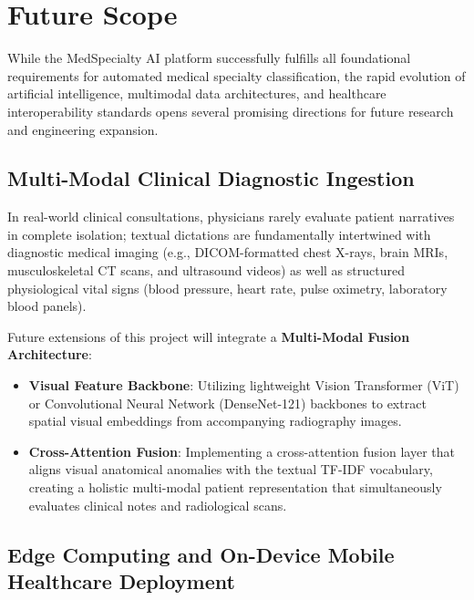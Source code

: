 \clearpage

\section{Future Scope}

While the MedSpecialty AI platform successfully fulfills all foundational requirements for automated medical specialty classification, the rapid evolution of artificial intelligence, multimodal data architectures, and healthcare interoperability standards opens several promising directions for future research and engineering expansion.

\subsection{Multi-Modal Clinical Diagnostic Ingestion}

In real-world clinical consultations, physicians rarely evaluate patient narratives in complete isolation; textual dictations are fundamentally intertwined with diagnostic medical imaging (e.g., DICOM-formatted chest X-rays, brain MRIs, musculoskeletal CT scans, and ultrasound videos) as well as structured physiological vital signs (blood pressure, heart rate, pulse oximetry, laboratory blood panels).

Future extensions of this project will integrate a \textbf{Multi-Modal Fusion Architecture}:
\begin{itemize}
    \item \textbf{Visual Feature Backbone}: Utilizing lightweight Vision Transformer (ViT) or Convolutional Neural Network (DenseNet-121) backbones to extract spatial visual embeddings from accompanying radiography images.
    \item \textbf{Cross-Attention Fusion}: Implementing a cross-attention fusion layer that aligns visual anatomical anomalies with the textual TF-IDF vocabulary, creating a holistic multi-modal patient representation that simultaneously evaluates clinical notes and radiological scans.
\end{itemize}

\subsection{Edge Computing and On-Device Mobile Healthcare Deployment}

